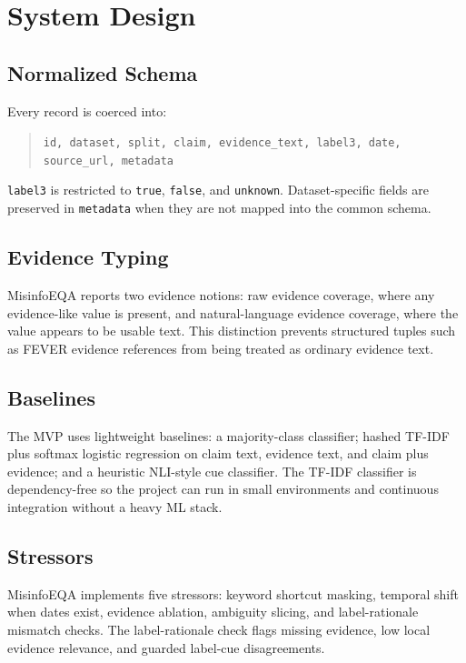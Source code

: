 \documentclass[11pt]{article}
\begin{document}
\section{System Design}

\subsection{Normalized Schema}

Every record is coerced into:

\begin{quote}
\texttt{id, dataset, split, claim, evidence\_text, label3, date, source\_url, metadata}
\end{quote}

\texttt{label3} is restricted to \texttt{true}, \texttt{false}, and
\texttt{unknown}. Dataset-specific fields are preserved in \texttt{metadata}
when they are not mapped into the common schema.

\subsection{Evidence Typing}

MisinfoEQA reports two evidence notions: raw evidence coverage, where any
evidence-like value is present, and natural-language evidence coverage, where
the value appears to be usable text. This distinction prevents structured tuples
such as FEVER evidence references from being treated as ordinary evidence text.

\subsection{Baselines}

The MVP uses lightweight baselines: a majority-class classifier; hashed TF-IDF
plus softmax logistic regression on claim text, evidence text, and claim plus
evidence; and a heuristic NLI-style cue classifier. The TF-IDF classifier is
dependency-free so the project can run in small environments and continuous
integration without a heavy ML stack.

\subsection{Stressors}

MisinfoEQA implements five stressors: keyword shortcut masking, temporal shift
when dates exist, evidence ablation, ambiguity slicing, and label-rationale
mismatch checks. The label-rationale check flags missing evidence, low local
evidence relevance, and guarded label-cue disagreements.
\end{document}
